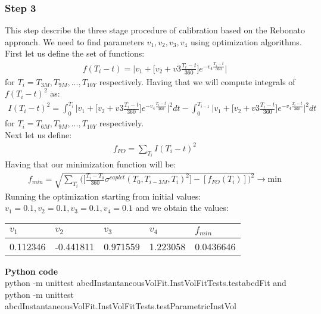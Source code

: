 \documentclass[11pt]{article}
\numberwithin{equation}{subsection}
\begin{document}
\subsubsection*{Step 3}
This step describe the three stage procedure of calibration based on the Rebonato approach.
We need to find parameters \(v_1, v_2, v_3, v_4\) using optimization algorithms. 
First let us define the set of functions:
\begin{eqnarray*}
	f(T_i - t) = \mathrel{\bigg|} v_1 + \bigg[v_2 + v3 \frac{T_i-t}{360}\bigg] e^{-v_4 \frac{T_i-t}{360}} \mathrel{\bigg|}
\end{eqnarray*}
for \(T_i = T_{3M}, T_{9M},..., T_{10Y}\) respectively.
Having that we will compute integrals of \(f(T_i - t)^2\) as:
\begin{eqnarray*}
	I(T_i - t)^2 = \int_{0}^{T_i} \mathrel{\bigg|} v_1 + \bigg[v_2 + v3 \frac{T_i-t}{360}\bigg] e^{-v_4 \frac{T_i-t}{360}} \mathrel{\Bigg|}^2 dt
	- \int_{0}^{T_{i-1}} \mathrel{\Bigg|} v_1 + \bigg[v_2 + v3 \frac{T_i-t}{360}\bigg] e^{-v_4 \frac{T_i-t}{360}} \mathrel{\bigg|}^2 dt
\end{eqnarray*}
for \(T_i = T_{6M}, T_{9M},..., T_{10Y}\) respectively.\\
Next let us define:
\begin{eqnarray*}
	f_{FO} = \sum_{T_i} I(T_i - t)^2
\end{eqnarray*}
Having that our minimization function will be:
\begin{eqnarray*}
	f_{min} = \sqrt{\sum_{T_i}\bigg(\bigg[\frac{T_i-T_0}{360} \sigma^{caplet}(T_0, T_{i-3M}, T_i)^2\bigg] - [f_{FO}(T_i)]\bigg)^2} \rightarrow \text{min}
\end{eqnarray*}
Running the optimization starting from initial values: \(v_1=0.1, v_2=0.1, v_3=0.1, v_4=0.1\) and 
we obtain the values:
\vskip 0.2cm 		
{
	\begin{center}
		\begin{tabular}{lllll}
			\hline
			\(v_1\)   & \(v_2\)  & \(v_3\)  & \(v_4\)  & \(f_{min}\) \\
			\hline
			 0.112346 & -0.441811 & 0.971559 & 1.223058 & 0.0436646 \\			
			\hline				 				
		\end{tabular}
	\end{center}
}
\vskip 0.4cm


\textbf{Python code}\\
python -m unittest abcdInstantaneousVolFit.InstVolFitTests.testabcdFit
and \\
python -m unittest abcdInstantaneousVolFit.InstVolFitTests.testParametricInstVol 
\end{document}
